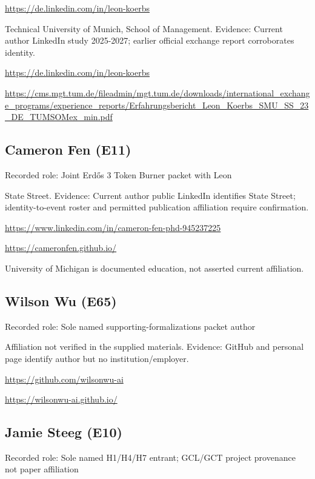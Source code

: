 \documentclass[11pt,a4paper]{article}
\begin{document}
{\small \url{https://de.linkedin.com/in/leon-koerbs}\par}

Technical University of Munich, School of Management. Evidence: Current author LinkedIn study 2025-2027; earlier official exchange report corroborates identity.

{\small \url{https://de.linkedin.com/in/leon-koerbs}\par}

{\small \url{https://cms.mgt.tum.de/fileadmin/mgt.tum.de/downloads/international_exchange_programs/experience_reports/Erfahrungsbericht_Leon_Koerbs_SMU_SS_23_DE_TUMSOMex_min.pdf}\par}

\subsection{Cameron Fen (E11)}
Recorded role: Joint Erdős 3 Token Burner packet with Leon

State Street. Evidence: Current author public LinkedIn identifies State Street; identity-to-event roster and permitted publication affiliation require confirmation.

{\small \url{https://www.linkedin.com/in/cameron-fen-phd-945237225}\par}

{\small \url{https://cameronfen.github.io/}\par}

University of Michigan is documented education, not asserted current affiliation.

\subsection{Wilson Wu (E65)}
Recorded role: Sole named supporting-formalizations packet author

Affiliation not verified in the supplied materials. Evidence: GitHub and personal page identify author but no institution/employer.

{\small \url{https://github.com/wilsonwu-ai}\par}

{\small \url{https://wilsonwu-ai.github.io/}\par}

\subsection{Jamie Steeg (E10)}
Recorded role: Sole named H1/H4/H7 entrant; GCL/GCT project provenance not paper affiliation
\end{document}
